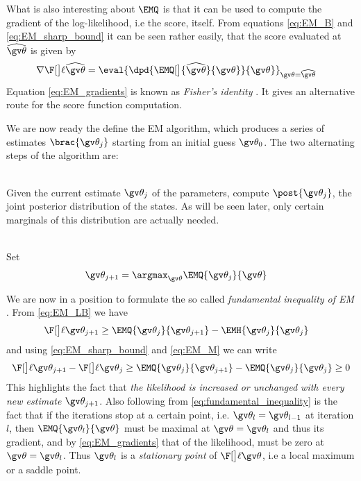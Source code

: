 What is also interesting about $\EMQ$ is that it can be used to compute the gradient of the log-likelihood, i.e
the score, itself. From equations \eqref{eq:EM_B}
and \eqref{eq:EM_sharp_bound} it can be seen rather easily, that  
the score evaluated at $\widehat{\Th}$ is given by
\begin{align}
		\score[\widehat\Th]&=
		\eval{\dpd{ \EMQ[\big]{\widehat\Th}{\Th}}{\Th}}_{\Th=\widehat\Th} \label{eq:EM_gradients}
\end{align} 
Equation \eqref{eq:EM_gradients} is known as \emph{Fisher's identity} \parencite{Cappe2005}. It gives
an alternative route for the score function computation.
 

We are now ready the define the EM algorithm, 
which produces a series of estimates $\brac{\Th_j}$
starting from an initial guess $\Th_0$. The two alternating
steps of the algorithm are:

\begin{description}
\addtolength{\leftskip}{1cm}
  \item[E-step]\hfill\\
  Given the current estimate $\Th_j$ of the parameters, compute	
  $\post{\Th_j}$, the joint posterior distribution of the states. 
  As will be seen later, only certain marginals of this distribution
  are actually needed.  
  \item[M-step]\hfill\\ 
  Set
    \begin{align}
		\Th_{j+1}&=\argmax_{\Th}\EMQ{\Th_j}{\Th} \label{eq:EM_M}
	\end{align}
\end{description}
We are now in a position to formulate the so called \emph{fundamental inequality of EM} \parencite{Cappe2005}.
From \eqref{eq:EM_LB} we have
\begin{align*}
	\lLH[\Th_{j+1}] & \geq \EMQ{\Th_j}{\Th_{j+1}} - \EMH{\Th_j}{\Th_{j}}
\end{align*}
and using \eqref{eq:EM_sharp_bound} and \eqref{eq:EM_M} we can write
\begin{align}
\label{eq:fundamental_inequality}	
\begin{split}	
	\lLH[\Th_{j+1}] - \lLH[\Th_j] & \geq \EMQ{\Th_j}{\Th_{j+1}} - \EMQ{\Th_j}{\Th_{j}} \geq 0\\
\end{split}
\end{align}
This highlights
the fact that \emph{the likelihood is increased or unchanged with every new estimate} $\Th_{j+1}$.
Also following from \eqref{eq:fundamental_inequality} is the fact that if the iterations
stop at a certain point, i.e. $\Th_{l}=\Th_{l-1}$ at iteration $l$, then
$\EMQ{\Th_l}{\Th}$ must be maximal at $\Th=\Th_l$ and thus its gradient, and 
by \eqref{eq:EM_gradients} that of the likelihood, must be zero at $\Th=\Th_l$. Thus
$\Th_l$ is a \emph{stationary point} of $\lLH$, i.e a local maximum or a saddle point.

